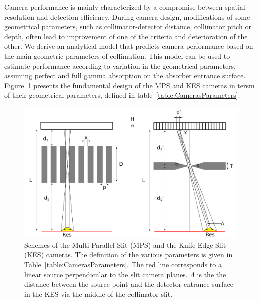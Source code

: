 \documentclass[a4paper,english,12pt]{article}
\begin{document}
Camera performance is mainly characterized by a compromise between spatial resolution and detection efficiency. During camera design, modifications of some geometrical parameters, such as collimator-detector distance, collimator pitch or depth, often lead to improvement of one of the criteria and deterioration of the other. We derive an analytical model that predicts camera performance based on the main geometric parameters of collimation. This model can be used to estimate performance according to variation in the geometrical parameters, assuming perfect and full gamma absorption on the absorber entrance surface. Figure~\ref{fig:CamerasParameters} presents the fundamental design of the MPS and KES cameras in tersm of their geometrical parameters, defined in table~\ref{table:CamerasParameters}.

\begin{figure}[htbp]
    \centering
    \includegraphics[width=.8\textwidth]{MPS-KES_scheme}
    \caption{Schemes of the Multi-Parallel Slit (MPS) and the Knife-Edge Slit (KES) cameras. The definition of the various parameters is given in Table~\ref{table:CamerasParameters}. The red line corresponds to a linear source perpendicular to the slit camera planes. $\Lambda$ is the the distance between the source point and the detector entrance surface in the KES via the middle of the collimator slit.}
    \label{fig:CamerasParameters}
\end{figure}
\end{document}
